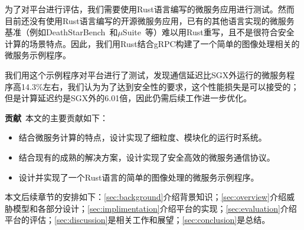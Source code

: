 为了对平台进行评估，我们需要使用Rust语言编写的微服务应用进行测试。然而目前还没有使用Rust语言编写的开源微服务应用，已有的其他语言实现的微服务基准（例如DeathStarBench~\cite{gan2019open}和$\mu$Suite~\cite{sriraman2018mu}等）难以用Rust重写，且不是很符合安全计算的场景特点。因此，我们用Rust结合gRPC构建了一个简单的图像处理相关的微服务示例程序。

我们用这个示例程序对平台进行了测试，发现通信延迟比SGX外运行的微服务程序高14.3\%左右，我们认为为了达到安全性的要求，这个性能损失是可以接受的；但是计算延迟约是SGX外的6.01倍，因此仍需后续工作进一步优化。

\textbf{贡献}\ 本文的主要贡献如下：
\begin{itemize}
    \item 结合微服务计算的特点，设计实现了细粒度、模块化的运行时系统。
    \item 结合现有的成熟的解决方案，设计实现了安全高效的微服务通信协议。
    \item 设计并实现了一个Rust语言的简单的图像处理的微服务示例程序。
\end{itemize}

本文后续章节的安排如下：\cref{sec:background}介绍背景知识；\cref{sec:overview}介绍威胁模型和各部分设计；\cref{sec:implimentation}介绍平台的实现；\cref{sec:evaluation}介绍平台的评估；\cref{sec:discussion}是相关工作和展望；\cref{sec:conclusion}是总结。


